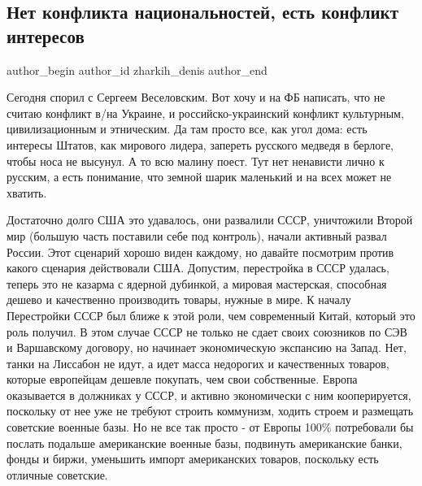  
 
 
 
 
 
\subsection{Нет конфликта национальностей, есть конфликт интересов}
\label{sec:27_11_2020.fb.1.zharkih_denis_konflikt_interesov}
\ifcmt
	author_begin
	author_id zharkih_denis
	author_end
\fi

Сегодня спорил с Сергеем Веселовским. Вот хочу и на ФБ написать, что не считаю
конфликт в/на Украине, и российско-украинский конфликт культурным,
цивилизационным и этническим. Да там просто все, как угол дома: есть интересы
Штатов, как мирового лидера, запереть русского медведя в берлоге, чтобы носа не
высунул. А то всю малину поест. Тут нет ненависти лично к русским, а есть
понимание, что земной шарик маленький и на всех может не хватить. 

Достаточно долго США это удавалось, они развалили СССР, уничтожили Второй мир
(большую часть поставили себе под контроль), начали активный развал России.
Этот сценарий хорошо виден каждому, но давайте посмотрим против какого сценария
действовали США.  Допустим, перестройка в СССР удалась, теперь это не казарма с
ядерной дубинкой, а мировая мастерская, способная дешево и качественно
производить товары, нужные в мире. К началу Перестройки СССР был ближе к этой
роли, чем современный Китай, который это роль получил. В этом случае СССР не
только не сдает своих союзников по СЭВ и Варшавскому договору, но начинает
экономическую экспансию на Запад. Нет, танки на Лиссабон не идут, а идет масса
недорогих и качественных товаров, которые европейцам дешевле покупать, чем свои
собственные. Европа оказывается в должниках у СССР, и активно экономически с
ним кооперируется, поскольку от нее уже не требуют строить коммунизм, ходить
строем и размещать советские военные базы. Но не все так просто - от Европы
100\% потребовали бы послать подальше американские военные базы, подвинуть
американские банки, фонды и биржи, уменьшить импорт американских товаров,
поскольку есть отличные советские. 

